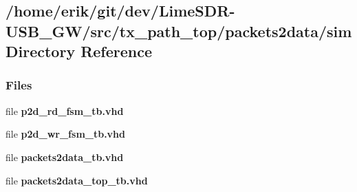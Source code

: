 \subsection{/home/erik/git/dev/\+Lime\+S\+D\+R-\/\+U\+S\+B\+\_\+\+G\+W/src/tx\+\_\+path\+\_\+top/packets2data/sim Directory Reference}
\label{dir_d7bbb4da2b4ca8d8335b35f72eadbca3}
\subsubsection*{Files}
\begin{DoxyCompactItemize}
\item 
file {\bf p2d\+\_\+rd\+\_\+fsm\+\_\+tb.\+vhd}
\item 
file {\bf p2d\+\_\+wr\+\_\+fsm\+\_\+tb.\+vhd}
\item 
file {\bf packets2data\+\_\+tb.\+vhd}
\item 
file {\bf packets2data\+\_\+top\+\_\+tb.\+vhd}
\end{DoxyCompactItemize}
